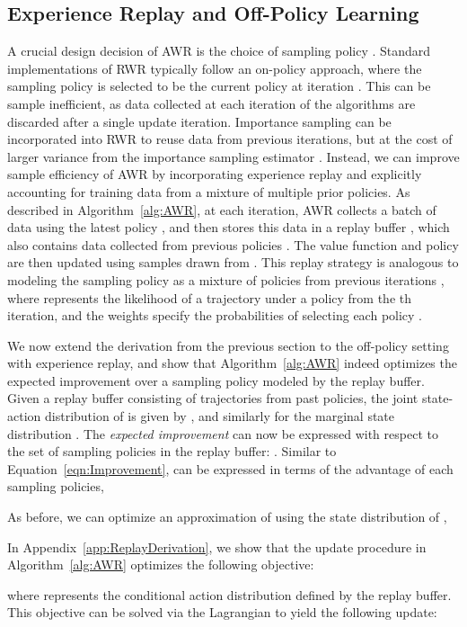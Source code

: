 \documentclass{article} \usepackage{iclr2020_conference,times}
\begin{document}
\subsection{Experience Replay and Off-Policy Learning}
\label{sec:ReplayDerivation}

A crucial design decision of AWR is the choice of sampling policy . Standard implementations of RWR typically follow an on-policy approach, where the sampling policy is selected to be the current policy  at iteration . This can be sample inefficient, as data collected at each iteration of the algorithms are discarded after a single update iteration. Importance sampling can be incorporated into RWR to reuse data from previous iterations, but at the cost of larger variance from the importance sampling estimator \citep{POWER2008}. Instead, we can improve sample efficiency of AWR by incorporating experience replay and explicitly accounting for training data from a mixture of multiple prior policies.
As described in Algorithm~\ref{alg:AWR}, at each iteration, AWR collects a batch of data using the latest policy , and then stores this data in a replay buffer , which also contains data collected from previous policies . The value function and policy are then updated using samples drawn from . This replay strategy is analogous to modeling the sampling policy as a mixture of policies from previous iterations , where  represents the likelihood of a trajectory  under a policy  from the th iteration, and the weights  specify the probabilities of selecting each policy .

We now extend the derivation from the previous section to the off-policy setting with experience replay, and show that Algorithm~\ref{alg:AWR} indeed optimizes the expected improvement over a sampling policy modeled by the replay buffer. Given a replay buffer consisting of trajectories from past policies, the joint state-action distribution of  is given by , and similarly for the marginal state distribution . The \textit{expected improvement} can now be expressed with respect to the set of sampling policies in the replay buffer: . Similar to Equation~\ref{eqn:Improvement},  can be expressed in terms of the advantage  of each sampling policies,

As before, we can optimize an approximation  of  using the state distribution of ,

In Appendix~\ref{app:ReplayDerivation}, we show that the update procedure in Algorithm~\ref{alg:AWR} optimizes the following objective:

where  represents the conditional action distribution defined by the replay buffer. This objective can be solved via the Lagrangian to yield the following update:
\end{document}
